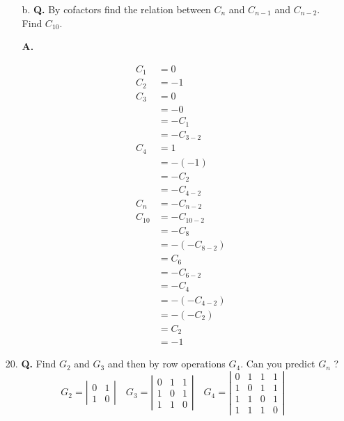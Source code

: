 \documentclass[main.tex]{subfiles}
\begin{document}
\begin{enumerate}
\begin{enumerate}
        \item [b.] \textbf{Q.} By cofactors find the relation between $C_{n}$ and $C_{n-1}$ and $C_{n-2}$. Find $C_{10}$. 
        
        \textbf{A.}
        
        $$
        \begin{aligned}
        C_{1}&=0\\
        C_{2}&=-1\\
        C_{3} &=0 \\
        &=-0 \\
        &=-C_{1} \\
        &=-C_{3-2} \\
        C_{4} &=1 \\
        &=-(-1) \\
        &=-C_{2} \\
        &=-C_{4-2}\\
        C_{n}&=-C_{n-2}\\
        C_{10} &=-C_{10-2} \\
        &=-C_{8} \\
        &=-\left(-C_{8-2}\right) \\
        &=C_{6} \\
        &=-C_{6-2} \\
        &=-C_{4} \\
        &=-\left(-C_{4-2}\right) \\
        &=-\left(-C_{2}\right) \\
        &= C_{2} \\
        &=-1
        \end{aligned}
        $$
        
    \end{enumerate}
    
    \item [20.] \textbf{Q.} Find $G_{2}$ and $G_{3}$ and then by row operations $G_{4}$. Can you predict $G_{n}$ ?
    $$
    G_{2}=\left|\begin{array}{ll}
    0 & 1 \\
    1 & 0
    \end{array}\right| \quad G_{3}=\left|\begin{array}{lll}
    0 & 1 & 1 \\
    1 & 0 & 1 \\
    1 & 1 & 0
    \end{array}\right| \quad G_{4}=\left|\begin{array}{llll}
    0 & 1 & 1 & 1 \\
    1 & 0 & 1 & 1 \\
    1 & 1 & 0 & 1 \\
    1 & 1 & 1 & 0
    \end{array}\right|
    $$
    

\end{enumerate}
\end{document}
